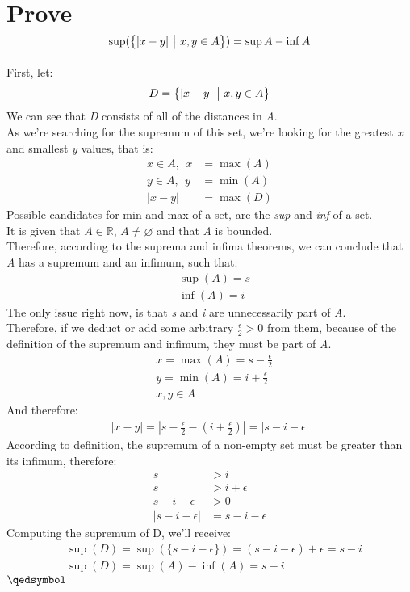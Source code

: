 \documentclass[a4paper, 12pt]{article}
\newcommand{\R}{\ensuremath{\mathbb{R}}}
\newcommand{\eq}[1]{\begin{align*}#1\end{align*}}
\newcommand{\set}[1]{\big{\{} #1 \big{\}}}
\renewcommand{\qed}{\hfill\(\qedsymbol\)}
\begin{document}
\begin{titlepage}
    
\end{titlepage}

\section{Prove \eq{
    \sup(\set{|x-y|~\big{|}~x,y\in{A}})=\sup{A}-\inf{A}
}}
First, let: \eq{D=\set{|x-y|~\big{|}~x,y\in{A}}}
We can see that \textit{D} consists of all of the distances in \textit{A}.\\
As we're searching for the supremum of this set, we're looking for the greatest \textit{x} and smallest \textit{y} values, that is:
\eq{
    x\in{A},~~x&=\max(A)\\
    y\in{A},~~y&=\min(A)\\
    |x-y|&=\max(D)
}
Possible candidates for min and max of a set, are the \textit{sup} and \textit{inf} of a set.\\
It is given that $A\in\R$, $A\neq\varnothing$ and that \textit{A} is bounded.\\
Therefore, according to the suprema and infima theorems, we can conclude that \textit{A} has a supremum and an infimum, such that:
\eq{
    &\sup(A)=s\\
    &\inf(A)=i
}
The only issue right now, is that \textit{s} and \textit{i} are unnecessarily part of \textit{A}.\\
Therefore, if we deduct or add some arbitrary $\frac{\epsilon}{2}>0$ from them, because of the definition of the supremum and infimum, they must be part of \textit{A}.
\eq{
    &x=\max(A)=s-\frac{\epsilon}{2}\\
    &y=\min(A)=i+\frac{\epsilon}{2}\\
    &x,y\in{A}
}
And therefore:
\eq{
    |x-y|=|s-\frac{\epsilon}{2}-(i+\frac{\epsilon}{2})|=|s-i-\epsilon|
}
According to definition, the supremum of a non-empty set must be greater than its infimum, therefore:
\eq{
    s&>i\\
    s&>i+\epsilon\\
    s-i-\epsilon&>0\\
    |s-i-\epsilon|&=s-i-\epsilon
}
Computing the supremum of D, we'll receive:
\eq{
    &\sup(D)=\sup(\{s-i-\epsilon\})=(s-i-\epsilon)+\epsilon=s-i\\
    &\sup(D)=\sup(A)-\inf(A)=s-i
}
\qed

\end{document}
